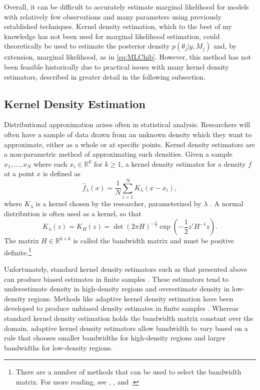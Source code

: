 \documentclass[twocolumn]{article}
\newcommand{\RR}{\mathbb{R}}
\begin{document}
Overall, it can be difficult to accurately estimate marginal likelihood for models with relatively few observations and many parameters using previously established techniques. Kernel density estimation, which to the best of my knowledge has not been used for marginal likelihood estimation, could theoretically be used to estimate the posterior density $p(\theta_j|y, M_j)$ and, by extension, marginal likelihood, as in \cref{eq:MLChib}. However, this method has not been feasible historically due to practical issues with many kernel density estimators, described in greater detail in the following subsection.

\subsection{Kernel Density Estimation}
\label{sec:KDE}


Distributional approximation arises often in statistical analysis. Researchers will often have a sample of data drawn from an unknown density which they want to approximate, either as a whole or at specific points. Kernel density estimators are a non-parametric method of approximating such densities. Given a sample $x_1, ..., x_N$ where each $x_i\in\RR^k$ for $k\geq1$, a kernel density estimator for a density $f$ at a point $x$ is defined as
\begin{equation}
	\hat{f}_\lambda(x) = \frac{1}{N}\sum_{i=1}^N K_\lambda(x - x_i),
\end{equation}
where $K_\lambda$ is a kernel chosen by the researcher, parameterized by $\lambda$ \citep{SilvermanDE}. A normal distribution is often used as a kernel, so that
\begin{equation}
	K_\lambda(z) = K_H(z) = \det(2\pi H)^{-\frac12} \exp\left(-\frac12 z' H^{-1} z\right).
\end{equation}
The matrix $H\in\RR^{k\times k}$ is called the bandwidth matrix and must be positive definite.\footnote{There are a number of methods that can be used to select the bandwidth matrix. For more reading, see \cite{SilvermanDE}, \cite{Scott}, and \cite{SheatherJones}.}

Unfortunately, standard kernel density estimators such as that presented above can produce biased estimates in finite samples \citep{SilvermanDE}. These estimators tend to underestimate density in high-density regions and overestimate density in low-density regions. Methods like adaptive kernel density estimation have been developed to produce unbiased density estimates in finite samples \citep{Portnoy}. Whereas standard kernel density estimation holds the bandwidth matrix constant over the domain, adaptive kernel density estimators allow bandwidth to vary based on a rule that chooses smaller bandwidths for high-density regions and larger bandwidths for low-density regions.
\end{document}
